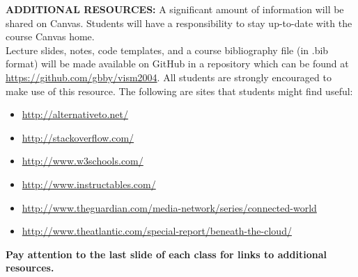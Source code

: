 \documentclass[10pt]{article}
\begin{document}
\textbf{ADDITIONAL RESOURCES:}
A significant amount of information will be shared on Canvas. Students will have a responsibility to stay up-to-date with the course Canvas home.\\ 
Lecture slides, notes, code templates, and a course bibliography file (in .bib format) will be made available on GitHub in a repository which can be found at \url{https://github.com/gbby/vism2004}. All students are strongly encouraged to make use of this resource. The following are sites that students might find useful:
 \begin{itemize}[noitemsep,nolistsep]
 	\item \url{http://alternativeto.net/}
 	\item \url{http://stackoverflow.com/}
 	\item \url{http://www.w3schools.com/}
 	\item \url{http://www.instructables.com/}
 	\item \url{http://www.theguardian.com/media-network/series/connected-world}
 	\item \url{http://www.theatlantic.com/special-report/beneath-the-cloud/}
 \end{itemize}
\textbf{Pay attention to the last slide of each class for links to additional resources.}
\end{document}
